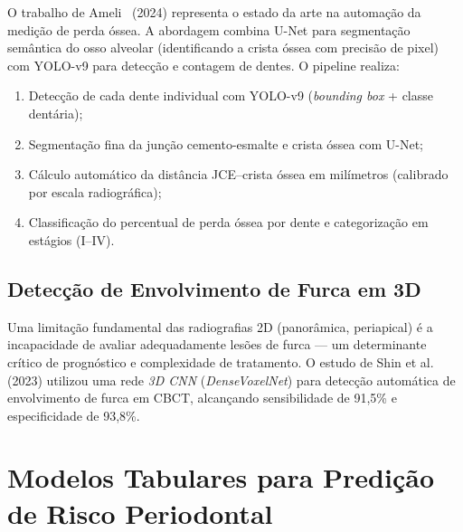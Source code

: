 O trabalho de Ameli~\cite{ameli2024} (2024) representa o estado da arte na automação da medição de perda óssea. A abordagem combina U-Net para segmentação semântica do osso alveolar (identificando a crista óssea com precisão de pixel) com YOLO-v9 para detecção e contagem de dentes. O pipeline realiza:
\begin{enumerate}
    \item Detecção de cada dente individual com YOLO-v9 (\textit{bounding box} + classe dentária);
    \item Segmentação fina da junção cemento-esmalte e crista óssea com U-Net;
    \item Cálculo automático da distância JCE--crista óssea em milímetros (calibrado por escala radiográfica);
    \item Classificação do percentual de perda óssea por dente e categorização em estágios (I--IV).
\end{enumerate}


\subsection{Detecção de Envolvimento de Furca em 3D}

Uma limitação fundamental das radiografias 2D (panorâmica, periapical) é a incapacidade de avaliar adequadamente lesões de furca --- um determinante crítico de prognóstico e complexidade de tratamento. O estudo de Shin et al. (2023) utilizou uma rede \textit{3D CNN} (\textit{DenseVoxelNet}) para detecção automática de envolvimento de furca em CBCT, alcançando sensibilidade de 91,5\% e especificidade de 93,8\%.


\section{Modelos Tabulares para Predição de Risco Periodontal}


